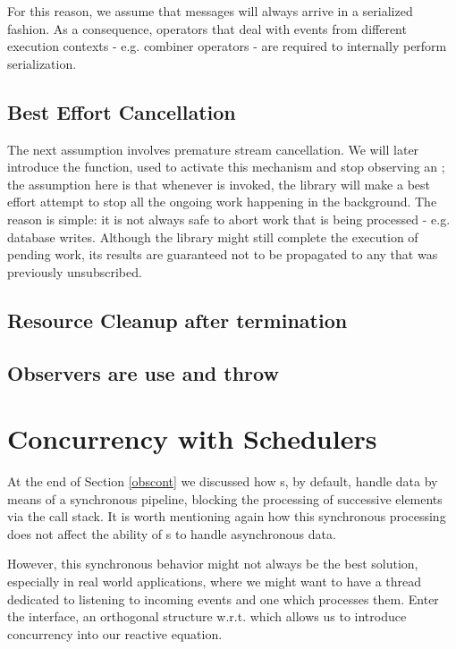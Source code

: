 For this reason, we assume that messages will always arrive in a serialized fashion. As a consequence, operators that deal with events from different execution contexts - e.g. combiner operators - are required to internally perform serialization.

\subsection{Best Effort Cancellation}
\label{ass-besteffort}
The next assumption involves premature stream cancellation. We will later introduce the  function, used to activate this mechanism and stop observing an ; the assumption here is that whenever  is invoked, the library will make a best effort attempt to stop all the ongoing work happening in the background. The reason is simple: it is not always safe to abort work that is being processed - e.g. database writes. Although the library might still complete the execution of pending work, its results are guaranteed not to be propagated to any  that was previously unsubscribed.

\subsection{Resource Cleanup after termination}
\subsection{Observers are use and throw}
\label{ass-usethrow}

\section{Concurrency with Schedulers}
\label{schedulers}

At the end of Section \ref{obscont} we discussed how s, by default, handle data by means of a synchronous pipeline, blocking the processing of successive elements via the call stack. It is worth mentioning again how this synchronous processing does not affect the ability of s to handle asynchronous data.

However, this synchronous behavior might not always be the best solution, especially in real world applications, where we might want to have a thread dedicated to listening to incoming events and one which processes them. Enter the  interface, an orthogonal\cite{wiki:orthogonality} structure w.r.t.  which allows us to introduce concurrency into our reactive equation. 

